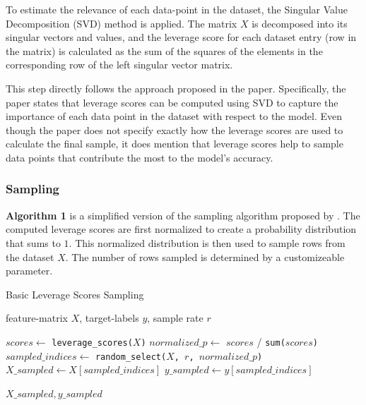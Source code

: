 \documentclass{article}
\theoremstyle{plain}
\theoremstyle{definition}
\theoremstyle{remark}
\begin{document}
To estimate the relevance of each data-point in the dataset, the Singular Value Decomposition (SVD) method is applied. The matrix $X$ is decomposed into its singular vectors and values, and the leverage score for each dataset entry (row in the matrix) is calculated as the sum of the squares of the elements in the corresponding row of the left singular vector matrix.

This step directly follows the approach proposed in the paper. Specifically, the paper states that leverage scores can be computed using SVD to capture the importance of each data point in the dataset with respect to the model. Even though the paper does not specify exactly how the leverage scores are used to calculate the final sample, it does mention that leverage scores help to sample data points that contribute the most to the model’s accuracy.


\subsubsection{Sampling}

\textbf{Algorithm 1} is a simplified version of the sampling algorithm proposed by \citet{chow24}. The computed leverage scores are first normalized to create a probability distribution that sums to $1$. This normalized distribution is then used to sample rows from the dataset $X$. The number of rows sampled is determined by a customizeable parameter.

\begin{algorithm}[tb]
	\caption{Basic Leverage Scores Sampling}
	\label{alg:example}
	\begin{algorithmic}
		 feature-matrix $X$, target-labels $y$, sample rate $r$
		
		\vspace{0.25cm}
		
		\STATE $scores \leftarrow$ \texttt{leverage\_scores($X$)}
		\STATE $normalized\_p \leftarrow$ $scores$ / \texttt{sum($scores$)}
		\STATE $sampled\_indices \leftarrow$ \texttt{random\_select($X$, $r$,  $normalized\_p$)}
		\STATE $X\_sampled \leftarrow X[sampled\_indices]$
		\STATE $y\_sampled \leftarrow y[sampled\_indices]$
		
		\vspace{0.25cm}
		
		 \texttt{$X\_sampled, y\_sampled$}
	\end{algorithmic}
\end{algorithm}
\end{document}
